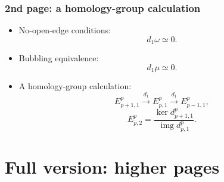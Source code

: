 \documentclass[xcolor=table, 10pt, aspectratio=43]{beamer}
\newcommand{\uone}{\mathrm U(1)}
\DeclareMathOperator{\img}{img}
\begin{document}
\begin{frame}
\frametitle{2nd page: a homology-group calculation}
\begin{itemize}
\item No-open-edge conditions:
\[d_1\omega\simeq 0.\]
\item Bubbling equivalence:
\[d_1\mu\simeq 0.\]
\item A homology-group calculation:
\[E^p_{p+1,1}\xrightarrow{d_1}E^p_{p,1}\xrightarrow{d_1}E^p_{p-1,1},\]
\[E^p_{p,2}=\frac{\ker d^p_{p+1,1}}{\img d^p_{p,1}}.\]
\end{itemize}
\end{frame}







\section{Full version: higher pages}
\end{document}
